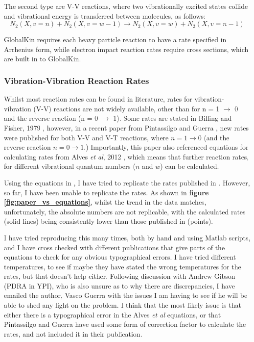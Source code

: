 \documentclass[11pt, oneside]{article}   	%
\begin{document}
The second type are V-V reactions, where two vibrationally excited states collide and vibrational energy is transferred between molecules, as follows:
\begin{equation}
N_2(X,v=n) + N_2 (X,v=w-1) \rightarrow N_2(X,v=w) + N_2(X,v=n-1)
\label{eqn:V-V}
\end{equation}

GlobalKin requires each heavy particle reaction to have a rate specified in Arrhenius form, while electron impact reaction rates require cross sections, which are built in to GlobalKin.

\subsubsection{Vibration-Vibration Reaction Rates}

Whilst most reaction rates can be found in literature, rates for vibration-vibration (V-V) reactions are not widely available, other than for n = 1 $\rightarrow$ 0 and the reverse reaction (n = 0 $\rightarrow$ 1).
Some rates are stated in Billing and Fisher, 1979 \cite{Billing1979vv}, however, in a recent paper from Pintassilgo and Guerra \cite{Pintassilgo2017modelling}, new rates were published for both V-V and V-T reactions, where $n = 1 \rightarrow 0$ (and the reverse reaction $n = 0 \rightarrow 1$.) 
Importantly, this paper also referenced equations for calculating rates from Alves \textit{et al}, 2012 \cite{Alves2012capacitively}, which means that further reaction rates, for different vibrational quantum numbers ($n$ and $w$) can be calculated.

Using the equations in \cite{Alves2012capacitively}, I have tried to replicate the rates published in \cite{Pintassilgo2017modelling}.
However, so far, I have been unable to replicate the rates.
As shown in \textbf{figure \ref{fig:paper_vs_equations}}, whilst the trend in the data matches, unfortunately, the absolute numbers are not replicable, with the calculated rates (solid lines) being consistently lower than those published in \cite{Pintassilgo2017modelling} (points).

I have tried reproducing this many times, both by hand and using Matlab scripts, and I have cross checked with different publications that give parts of the equations to check for any obvious typographical errors. 
I have tried different temperatures, to see if maybe they have stated the wrong temperatures for the rates, but that doesn't help either.
Following discussion with Andrew Gibson (PDRA in YPI), who is also unsure as to why there are discrepancies, I have emailed the author, Vasco Guerra with the issues I am having to see if he will be able to shed any light on the problem.
I think that the most likely issue is that either there is a typographical error in the Alves \textit{et al} equations, or that Pintassilgo and Guerra have used some form of correction factor to calculate the rates, and not included it in their publication. 
\end{document}
